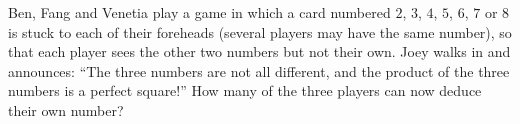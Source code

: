 Ben, Fang and Venetia play a game in which a card numbered $2$, $3$, $4$, $5$, $6$, $7$ or $8$ is stuck to each of their foreheads (several players may have the same number), so that each player sees the other two numbers but not their own. Joey walks in and announces: ``The three numbers are not all different, and the product of the three numbers is a perfect square!'' How many of the three players can now deduce their own number?

